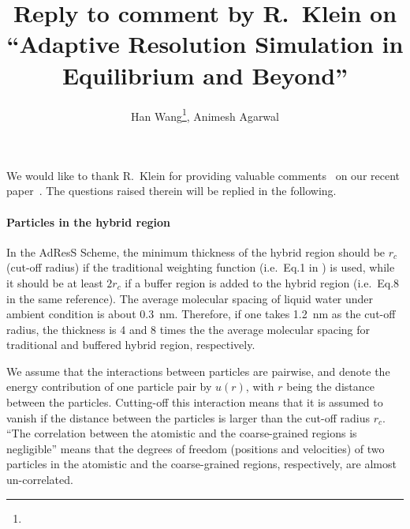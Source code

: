 \documentclass[epjST]{svjour}
\begin{document}
%
\title{Reply to comment by R.~Klein on ``Adaptive Resolution Simulation in Equilibrium and Beyond''}
\author{Han Wang\fnmsep\thanks{}, Animesh Agarwal}
%
%
%
\maketitle
%

We would like to thank R.~Klein for providing valuable comments~\cite{klein2015comment}
on our recent paper~\cite{wang2015adaptive}. 
The questions raised therein will be replied in the following. 

\paragraph{Particles in the hybrid region}
In the AdResS Scheme, the minimum thickness of the hybrid region
should be $r_c$ (cut-off radius) if the traditional weighting function
(i.e.~Eq.1 in \cite{wang2015adaptive}) is used, while it should be at least
$2r_c$ if a buffer region  is added to the hybrid
region (i.e.~Eq.8 in the same reference).
The average molecular spacing of liquid water under ambient
condition is about 0.3~nm. Therefore, if one takes 1.2~nm as the cut-off
radius, the thickness is 4 and 8 times the
the average molecular spacing for traditional and buffered hybrid region, respectively.

We assume that the interactions between particles are pairwise, and denote
the energy contribution of one particle pair by $u(r)$, with $r$ being the distance
between the particles. Cutting-off this interaction means that it is assumed to vanish
if the distance between the particles is larger than the cut-off radius $r_c$.
``The correlation between the atomistic and the coarse-grained
regions is negligible'' means that the
degrees of freedom (positions and velocities) of two particles
in the atomistic and the coarse-grained regions, respectively, are almost un-correlated.
\end{document}
